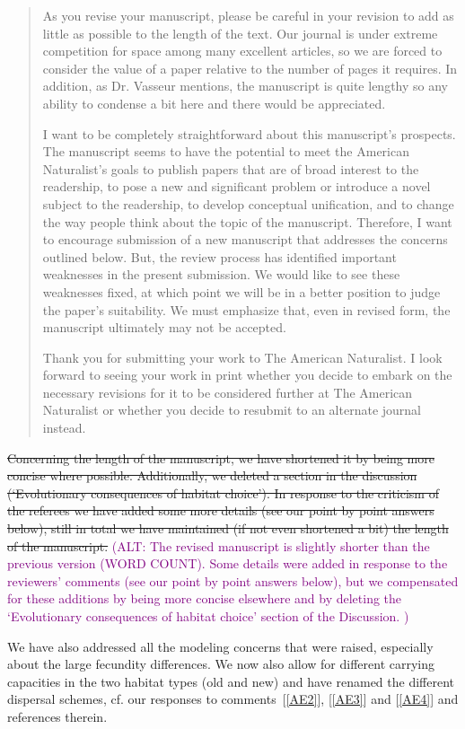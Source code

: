 \documentclass[11pt]{article}
\newenvironment{referee}{\vspace{0.cm} \sffamily \color{colreferee} \begin{quotation} }{\end{quotation} \vspace{0.cm}}
\newcommand{\lmarginpar}[1]{\reversemarginpar\marginpar{\textcolor{colreferee}{\textbf{\textsf{[#1]}}}}}
\newcommand{\addnb}[1]{\refstepcounter{numcom}\lmarginpar{\arabic{numcom}}\label{#1}}
\newcommand{\comref}[1]{[\ref{#1}]}
\newcommand{\florence}[1]{\textcolor{purple}{(#1)}}
\newcounter{numcom}
\begin{document}
\begin{referee}
As \addnb{editor3}you revise your manuscript, please be careful in your revision to add as little as possible to the length of the text. Our journal is under extreme competition for space among many excellent articles, so we are forced to consider the value of a paper relative to the number of pages it requires. In addition, as Dr. Vasseur mentions, the manuscript is quite lengthy so any ability to condense a bit here and there would be appreciated. 

I want to be completely straightforward about this manuscript's prospects. The manuscript seems to have the potential to meet the American Naturalist's goals to publish papers that are of broad interest to the readership, to pose a new and significant problem or introduce a novel subject to the readership, to develop conceptual unification, and to change the way people think about the topic of the manuscript. Therefore, I want to encourage submission of a new manuscript that addresses the concerns outlined below. But, the review process has identified important weaknesses in the present submission. We would like to see these weaknesses fixed, at which point we will be in a better position to judge the paper’s suitability. We must emphasize that, even in revised form, the manuscript ultimately may not be accepted. 

Thank you for submitting your work to The American Naturalist. I look forward to seeing your work in print whether you decide to embark on the necessary revisions for it to be considered further at The American Naturalist or whether you decide to resubmit to an alternate journal instead. 
\end{referee}
%
\st{Concerning the length of the manuscript, we have shortened it by being more concise where possible. Additionally, we deleted a section in the discussion (`Evolutionary consequences of habitat choice'). In response to the criticism of the referees we have added some more details (see our point by point answers below), still in total we have maintained (if not even shortened a bit) the length of the manuscript. }
\florence{ALT: The revised manuscript is slightly shorter than the previous version (WORD COUNT). Some details were added in response to the reviewers' comments (see our point by point answers below), but we compensated for these additions by being more concise elsewhere and by deleting the `Evolutionary consequences of habitat choice' section of the Discussion. }

We have also addressed all the modeling concerns that were raised, especially about the large fecundity differences. We now also allow for different carrying capacities in the two habitat types (old and new) and have renamed the different dispersal schemes, cf. our responses to comments~\comref{AE2}, \comref{AE3} and \comref{AE4} and references therein.
\end{document}
